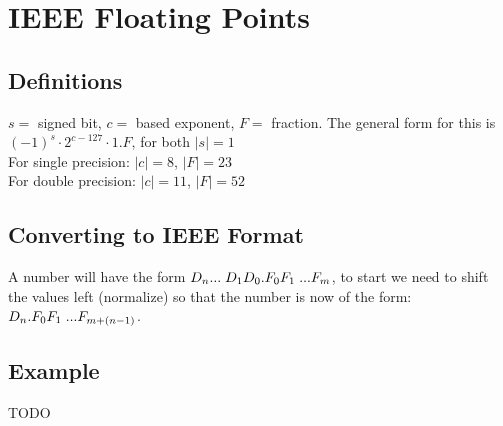 \section{IEEE Floating Points}
\subsection*{Definitions}
$s = $ signed bit, $c =$ based exponent, $F =$ fraction. The general form
for this is $(-1)^s \cdot 2^{c - 127} \cdot 1.F$, for both $|s| = 1$\\
For single precision: $|c| = 8$, $|F| = 23$\\
For double precision: $|c| = 11$, $|F| = 52$\\

\subsection*{Converting to IEEE Format}
A number will have the form $D_n ... \hspace{1mm} D_1 D_0 . F_0 F_1 \hspace{1mm} ... F_m$,
to start we need to shift the values left (normalize) so that the number is now
of the form: $D_n . F_0 F_1 \hspace{1mm} ... F_{m + (n-1)}$.

\subsection*{Example}
TODO
